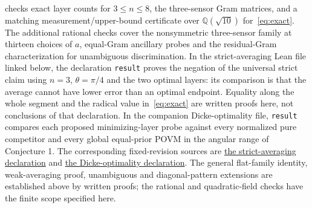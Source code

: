 \documentclass[11pt]{article}
\begin{document}
checks exact layer counts for $3\leq n\leq8$, the three-sensor Gram matrices,
and a matching measurement/upper-bound certificate over
$\mathbb Q(\sqrt{10})$ for~\eqref{eq:exact}.
The additional rational checks cover the nonsymmetric three-sensor
family at thirteen choices of $a$, equal-Gram ancillary probes and the
residual-Gram characterization for unambiguous discrimination.
In the strict-averaging Lean file linked below, the declaration
\texttt{result} proves the negation
of the universal strict claim using $n=3$, $\theta=\pi/4$ and the two
optimal layers: its comparison is that the average cannot have lower
error than an optimal endpoint. Equality along the whole segment and
the radical value in~\eqref{eq:exact} are written proofs here, not
conclusions of that declaration. In the companion Dicke-optimality file,
\texttt{result} compares each proposed
minimizing-layer probe against every normalized pure competitor and every
global equal-prior POVM in the angular range of Conjecture 1.
The corresponding fixed-revision sources are
\href{https://github.com/the-omega-institute/trureturing/blob/15070fa5f71c4237050acc7ebe058958cbc04e6e/D5/S3/Quantum/Measurements/DetectorSensorStrictAveragingRefutation.lean}{the strict-averaging declaration}
and
\href{https://github.com/the-omega-institute/trureturing/blob/15070fa5f71c4237050acc7ebe058958cbc04e6e/D5/S3/Quantum/Measurement/DetectorSensorDickeOptimality.lean}{the Dicke-optimality declaration}.
The general flat-family identity, weak-averaging
proof, unambiguous and diagonal-pattern extensions are established above
by written proofs; the rational and quadratic-field checks have the
finite scope specified here.
\end{document}
